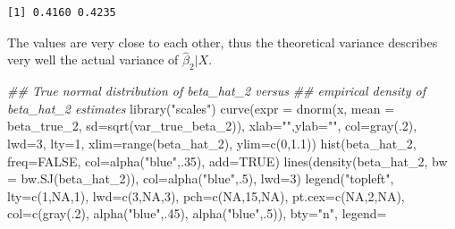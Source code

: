 \documentclass[
  letterpaper,
  DIV=11,
  numbers=noendperiod]{scrreprt}
\newenvironment{Shaded}{\begin{snugshade}}{\end{snugshade}}
\newcommand{\AttributeTok}[1]{\textcolor[rgb]{0.40,0.45,0.13}{#1}}
\newcommand{\ConstantTok}[1]{\textcolor[rgb]{0.56,0.35,0.01}{#1}}
\newcommand{\DecValTok}[1]{\textcolor[rgb]{0.68,0.00,0.00}{#1}}
\newcommand{\DocumentationTok}[1]{\textcolor[rgb]{0.37,0.37,0.37}{\textit{#1}}}
\newcommand{\FloatTok}[1]{\textcolor[rgb]{0.68,0.00,0.00}{#1}}
\newcommand{\FunctionTok}[1]{\textcolor[rgb]{0.28,0.35,0.67}{#1}}
\newcommand{\NormalTok}[1]{\textcolor[rgb]{0.00,0.23,0.31}{#1}}
\newcommand{\StringTok}[1]{\textcolor[rgb]{0.13,0.47,0.30}{#1}}
\theoremstyle{definition}
\theoremstyle{plain}
\theoremstyle{plain}
\theoremstyle{remark}
\begin{document}
\begin{verbatim}
[1] 0.4160 0.4235
\end{verbatim}

The values are very close to each other, thus the theoretical variance
describes very well the actual variance of \(\hat\beta_2|X\).

\begin{Shaded}
\begin{Highlighting}[]
\DocumentationTok{\#\# True normal distribution of beta\_hat\_2 versus }
\DocumentationTok{\#\# empirical density of beta\_hat\_2 estimates}
\FunctionTok{library}\NormalTok{(}\StringTok{"scales"}\NormalTok{)}
\FunctionTok{curve}\NormalTok{(}\AttributeTok{expr =} \FunctionTok{dnorm}\NormalTok{(x, }\AttributeTok{mean =}\NormalTok{ beta\_true\_2, }
                   \AttributeTok{sd=}\FunctionTok{sqrt}\NormalTok{(var\_true\_beta\_2)), }
      \AttributeTok{xlab=}\StringTok{""}\NormalTok{,}\AttributeTok{ylab=}\StringTok{""}\NormalTok{, }\AttributeTok{col=}\FunctionTok{gray}\NormalTok{(.}\DecValTok{2}\NormalTok{), }\AttributeTok{lwd=}\DecValTok{3}\NormalTok{, }\AttributeTok{lty=}\DecValTok{1}\NormalTok{, }
      \AttributeTok{xlim=}\FunctionTok{range}\NormalTok{(beta\_hat\_2), }\AttributeTok{ylim=}\FunctionTok{c}\NormalTok{(}\DecValTok{0}\NormalTok{,}\FloatTok{1.1}\NormalTok{))}
\FunctionTok{hist}\NormalTok{(beta\_hat\_2, }\AttributeTok{freq=}\ConstantTok{FALSE}\NormalTok{, }\AttributeTok{col=}\FunctionTok{alpha}\NormalTok{(}\StringTok{"blue"}\NormalTok{,.}\DecValTok{35}\NormalTok{), }\AttributeTok{add=}\ConstantTok{TRUE}\NormalTok{)}
\FunctionTok{lines}\NormalTok{(}\FunctionTok{density}\NormalTok{(beta\_hat\_2, }\AttributeTok{bw =} \FunctionTok{bw.SJ}\NormalTok{(beta\_hat\_2)), }
      \AttributeTok{col=}\FunctionTok{alpha}\NormalTok{(}\StringTok{"blue"}\NormalTok{,.}\DecValTok{5}\NormalTok{), }\AttributeTok{lwd=}\DecValTok{3}\NormalTok{)}
\FunctionTok{legend}\NormalTok{(}\StringTok{"topleft"}\NormalTok{, }\AttributeTok{lty=}\FunctionTok{c}\NormalTok{(}\DecValTok{1}\NormalTok{,}\ConstantTok{NA}\NormalTok{,}\DecValTok{1}\NormalTok{), }\AttributeTok{lwd=}\FunctionTok{c}\NormalTok{(}\DecValTok{3}\NormalTok{,}\ConstantTok{NA}\NormalTok{,}\DecValTok{3}\NormalTok{), }\AttributeTok{pch=}\FunctionTok{c}\NormalTok{(}\ConstantTok{NA}\NormalTok{,}\DecValTok{15}\NormalTok{,}\ConstantTok{NA}\NormalTok{), }\AttributeTok{pt.cex=}\FunctionTok{c}\NormalTok{(}\ConstantTok{NA}\NormalTok{,}\DecValTok{2}\NormalTok{,}\ConstantTok{NA}\NormalTok{),}
     \AttributeTok{col=}\FunctionTok{c}\NormalTok{(}\FunctionTok{gray}\NormalTok{(.}\DecValTok{2}\NormalTok{), }\FunctionTok{alpha}\NormalTok{(}\StringTok{"blue"}\NormalTok{,.}\DecValTok{45}\NormalTok{), }\FunctionTok{alpha}\NormalTok{(}\StringTok{"blue"}\NormalTok{,.}\DecValTok{5}\NormalTok{)), }\AttributeTok{bty=}\StringTok{"n"}\NormalTok{, }\AttributeTok{legend=} 

\end{Highlighting}
\end{Shaded}
\end{document}
